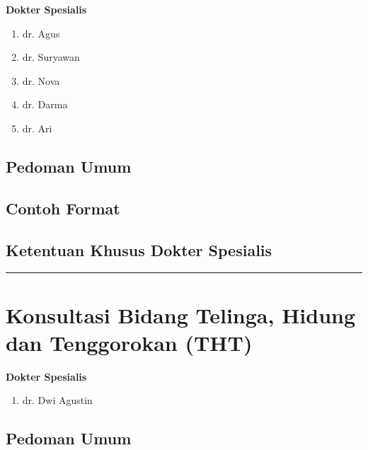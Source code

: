 \documentclass[
]{book}
\providecommand{\tightlist}{%
  \setlength{\itemsep}{0pt}\setlength{\parskip}{0pt}}
\begin{document}
\textbf{Dokter Spesialis}

\begin{enumerate}
\def\labelenumi{\arabic{enumi}.}
\tightlist
\item
  dr. Agus
\item
  dr. Suryawan
\item
  dr. Nova
\item
  dr. Darma
\item
  dr. Ari
\end{enumerate}

\hypertarget{pedoman-umum-5}{%
\subsection{Pedoman Umum}\label{pedoman-umum-5}}

\hypertarget{contoh-format-5}{%
\subsection{Contoh Format}\label{contoh-format-5}}

\hypertarget{ketentuan-khusus-dokter-spesialis-3}{%
\subsection{Ketentuan Khusus Dokter Spesialis}\label{ketentuan-khusus-dokter-spesialis-3}}

\begin{center}\rule{0.5\linewidth}{0.5pt}\end{center}

\hypertarget{konsultasi-bidang-telinga-hidung-dan-tenggorokan-tht}{%
\section{Konsultasi Bidang Telinga, Hidung dan Tenggorokan (THT)}\label{konsultasi-bidang-telinga-hidung-dan-tenggorokan-tht}}

\textbf{Dokter Spesialis}

\begin{enumerate}
\def\labelenumi{\arabic{enumi}.}
\tightlist
\item
  dr. Dwi Agustin
\end{enumerate}

\hypertarget{pedoman-umum-6}{%
\subsection{Pedoman Umum}\label{pedoman-umum-6}}
\end{document}

